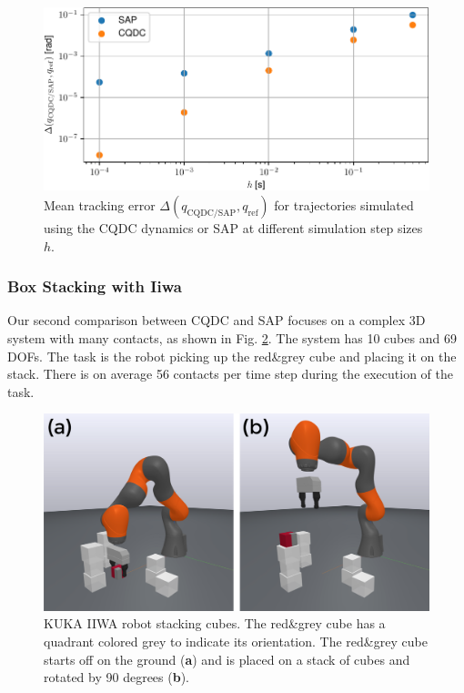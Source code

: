 \begin{figure}[h]
\centering
\includegraphics[width=0.8\linewidth]{figures/02_quasi_static_dynamics/iiwa_trajectory_tracking_error_vs_time_step.pdf}
\caption{Mean tracking error $\Delta(q_\mathrm{CQDC/SAP}, q_\mathrm{ref})$ for trajectories simulated using the CQDC dynamics or SAP at different simulation step sizes $h$.}
\label{fig:iiwa_trajectory_tracking_error_vs_time_step}
\end{figure}


\subsubsection{Box Stacking with Iiwa}
Our second comparison between CQDC and SAP focuses on a complex 3D system with many contacts, as shown in Fig. \ref{fig:iiwa_cube_stacking}. The system has 10 cubes and 69 DOFs. The task is the robot picking up the red\&grey cube and placing it on the stack. There is on average 56 contacts per time step during the execution of the task.
\begin{figure}
\centering
\includegraphics[width=0.75\linewidth]{figures/02_quasi_static_dynamics/start_and_final_configurations.png}
\caption{KUKA IIWA robot stacking cubes. The red\&grey cube has a quadrant colored grey to indicate its orientation. The red\&grey cube starts off on the ground (\textbf{a}) and is placed on a stack of cubes and rotated by 90 degrees (\textbf{b}).}
\label{fig:iiwa_cube_stacking}
\end{figure}

